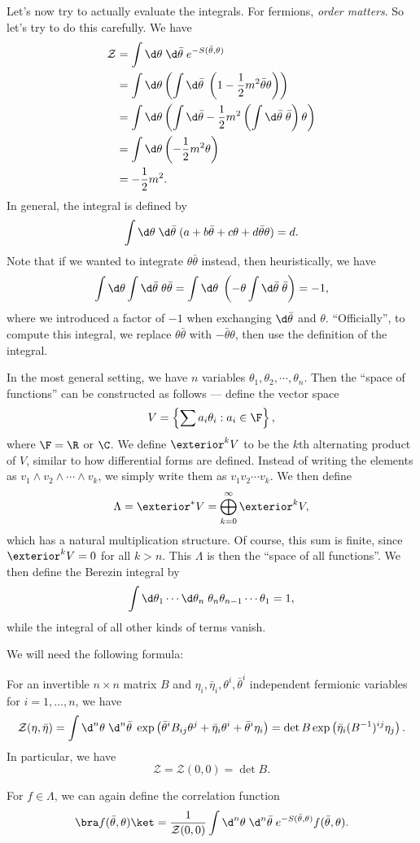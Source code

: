 \documentclass[a4paper]{article}
\begin{document}
Let's now try to actually evaluate the integrals. For fermions, \emph{order matters}. So let's try to do this carefully. We have
\begin{align*}
  \mathcal{Z} &= \int \d \theta \;\d \bar{\theta}\; e^{-S(\bar{\theta}, \theta)}\\
  &= \int \d \theta \left(\int \d \bar{\theta}\; \left(1 - \frac{1}{2} m^2 \bar{\theta} \theta\right)\right)\\
  &= \int \d \theta \left(\int \d \bar{\theta} - \frac{1}{2} m^2 \left(\int \d \bar{\theta}\; \bar{\theta}\right) \theta \right)\\
  &= \int \d \theta \left(- \frac{1}{2} m^2 \theta\right)\\
  &= -\frac{1}{2} m^2.
\end{align*}
In general, the integral is defined by
\[
  \int \d \theta\;\d \bar{\theta}\; (a + b \bar{\theta} + c \theta + d \bar{\theta} \theta) = d.
\]
Note that if we wanted to integrate $\theta \bar{\theta}$ instead, then heuristically, we have
\[
  \int \d \theta \int \d \bar{\theta}\; \theta \bar \theta = \int \d \theta \; \left(-\theta \int \d \bar{\theta}\; \bar{\theta}\right) = -1,
\]
where we introduced a factor of $-1$ when exchanging $\d \bar{\theta}$ and $\theta$. ``Officially'', to compute this integral, we replace $\theta \bar{\theta}$ with $-\bar{\theta} \theta$, then use the definition of the integral.

In the most general setting, we have $n$ variables $\theta_1, \theta_2, \cdots, \theta_n$. Then the ``space of functions'' can be constructed as follows --- define the vector space
\[
  V = \left\{\sum a_i \theta_i: a_i \in \F\right\},
\]
where $\F = \R$ or $\C$. We define $\exterior^k V$ to be the $k$th alternating product of $V$, similar to how differential forms are defined. Instead of writing the elements as $v_1 \wedge v_2 \wedge \cdots \wedge v_k$, we simply write them as $v_1v_2 \cdots v_k$. We then define
\[
  \Lambda = \exterior^*V = \bigoplus_{k = 0}^\infty \exterior^k V,
\]
which has a natural multiplication structure. Of course, this sum is finite, since $\exterior^k V = 0$ for all $k > n$. This $\Lambda$ is then the ``space of all functions''. We then define the Berezin integral by
\[
  \int \d \theta_1 \cdots \d \theta_n\; \theta_n \theta_{n - 1} \cdots \theta_1 = 1,
\]
while the integral of all other kinds of terms vanish.

We will need the following formula:
\begin{prop}
  For an invertible $n \times n$ matrix $B$ and $\eta_i, \bar{\eta}_i, \theta^i, \bar{\theta}^i$ independent fermionic variables for $i = 1,\ldots, n$, we have
  \[
    \mathcal{Z}(\eta, \bar{\eta}) = \int \d^n \theta\; \d^n \bar{\theta}\;\exp\left(\bar{\theta}^i B_{ij} \theta^j + \bar{\eta}_i \theta^i + \bar{\theta}^i \eta_i\right) = \det B \exp\left(\bar{\eta}_i (B^{-1})^{ij} \eta_j\right).
  \]
  In particular, we have
  \[
    \mathcal{Z} = \mathcal{Z}(0, 0) = \det B.
  \]
\end{prop}
For $f \in \Lambda$, we can again define the correlation function
\[
  \bra f(\bar{\theta}, \theta)\ket = \frac{1}{\mathcal{Z}(0, 0)} \int \d^n \theta\; \d^n \bar{\theta}\; e^{-S(\bar{\theta}, \theta)} f(\bar{\theta}, \theta).
\]
\end{document}
